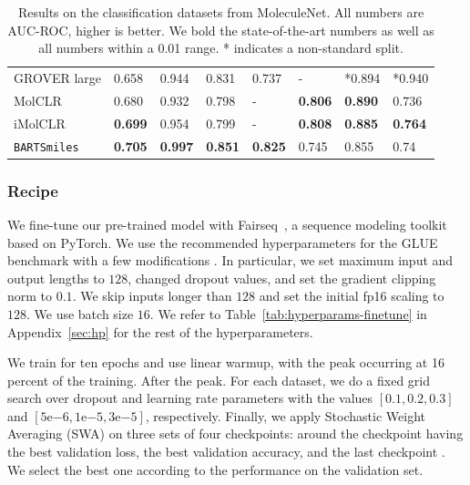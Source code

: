 \documentclass{article} %
\newcommand{\MODEL}{\texttt{BARTSmiles}}
\begin{document}
\begin{table}[]
\begin{tabular}{llllllll}
GROVER large  & 0.658                     & 0.944                       & 0.831                     & 0.737          & -                     & *0.894                 & *0.940                 \\
MolCLR        & 0.680                     & 0.932                       & 0.798                     & -                                  & \textbf{0.806}        & \textbf{0.890}            & 0.736                 \\
iMolCLR       & \textbf{0.699}            & 0.954                       & 0.799                     & -                                  & \textbf{0.808}        & \textbf{0.885}            & \textbf{0.764}         \\\midrule
\MODEL{} & \textbf{0.705}                     & \textbf{0.997}              & \textbf{0.851}                     & \textbf{0.825} & 0.745                 & 0.855                 & 0.74                 \\ \bottomrule
\end{tabular}
\caption{Results on the classification datasets from MoleculeNet. All numbers are AUC-ROC, higher is better. We bold the state-of-the-art numbers as well as all numbers within a 0.01 range. * indicates a non-standard split.}
\label{tab:results-classification}
\end{table}
\subsubsection{Recipe}


We fine-tune our pre-trained model with Fairseq~\citep{fairseq}, a sequence modeling toolkit based on PyTorch. We use the recommended hyperparameters for the GLUE benchmark with a few modifications \citep{GLUE}. In particular, we set maximum input and output lengths to $128$, changed dropout values, and set the gradient clipping norm to $0.1$. We skip inputs longer than $128$ and set the initial fp16 scaling to $128$. We use batch size $16$. We refer to Table~\ref{tab:hyperparams-finetune} in Appendix~\ref{sec:hp} for the rest of the hyperparameters.

We train for ten epochs and use linear warmup, with the peak occurring at 16 percent of the training. After the peak. For each dataset, we do a fixed grid search over dropout and learning rate parameters with the values $\left[0.1, 0.2, 0.3\right]$ and $\left[5\mathrm{e}{-6}, 1\mathrm{e}{-5}, 3\mathrm{e}{-5}\right]$, respectively. Finally, we apply Stochastic Weight Averaging (SWA) on three sets of four checkpoints: around the checkpoint having the best validation loss, the best validation accuracy, and the last checkpoint \citep{SWA}. We select the best one according to the performance on the validation set.
\end{document}
